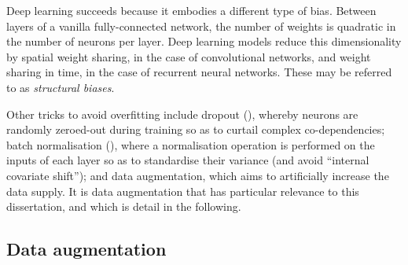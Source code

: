 Deep learning succeeds because it embodies a different type of bias. Between layers of a vanilla fully-connected network, the number of weights is quadratic in the number of neurons per layer. Deep learning models reduce this dimensionality by spatial weight sharing, in the case of convolutional networks, and weight sharing in time, in the case of recurrent neural networks. These may be referred to as \emph{structural biases}.

Other tricks to avoid overfitting include dropout (\cite{srivastava2014dropout}), whereby neurons are randomly zeroed-out during training so as to curtail complex co-dependencies; batch normalisation (\cite{ioffe2015batch}), where a normalisation operation is performed on the inputs of each layer so as to standardise their variance (and avoid ``internal covariate shift''); and data augmentation, which aims to artificially increase the data supply. It is data augmentation that has particular relevance to this dissertation, and which is detail in the following.


\subsection{Data augmentation}

